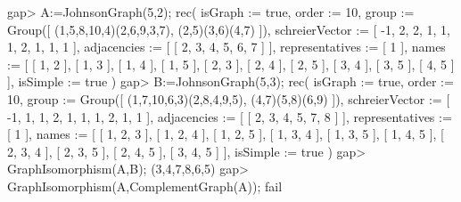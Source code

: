 \beginexample
gap> A:=JohnsonGraph(5,2);
rec( isGraph := true, order := 10, 
  group := Group([ (1,5,8,10,4)(2,6,9,3,7), (2,5)(3,6)(4,7) ]), 
  schreierVector := [ -1, 2, 2, 1, 1, 1, 2, 1, 1, 1 ], 
  adjacencies := [ [ 2, 3, 4, 5, 6, 7 ] ], representatives := [ 1 ], 
  names := [ [ 1, 2 ], [ 1, 3 ], [ 1, 4 ], [ 1, 5 ], [ 2, 3 ], [ 2, 4 ], 
      [ 2, 5 ], [ 3, 4 ], [ 3, 5 ], [ 4, 5 ] ], isSimple := true )
gap> B:=JohnsonGraph(5,3);
rec( isGraph := true, order := 10, 
  group := Group([ (1,7,10,6,3)(2,8,4,9,5), (4,7)(5,8)(6,9) ]), 
  schreierVector := [ -1, 1, 1, 2, 1, 1, 1, 2, 1, 1 ], 
  adjacencies := [ [ 2, 3, 4, 5, 7, 8 ] ], representatives := [ 1 ], 
  names := [ [ 1, 2, 3 ], [ 1, 2, 4 ], [ 1, 2, 5 ], [ 1, 3, 4 ], [ 1, 3, 5 ], 
      [ 1, 4, 5 ], [ 2, 3, 4 ], [ 2, 3, 5 ], [ 2, 4, 5 ], [ 3, 4, 5 ] ], 
  isSimple := true )
gap> GraphIsomorphism(A,B);
(3,4,7,8,6,5)
gap> GraphIsomorphism(A,ComplementGraph(A));
fail
\endexample
